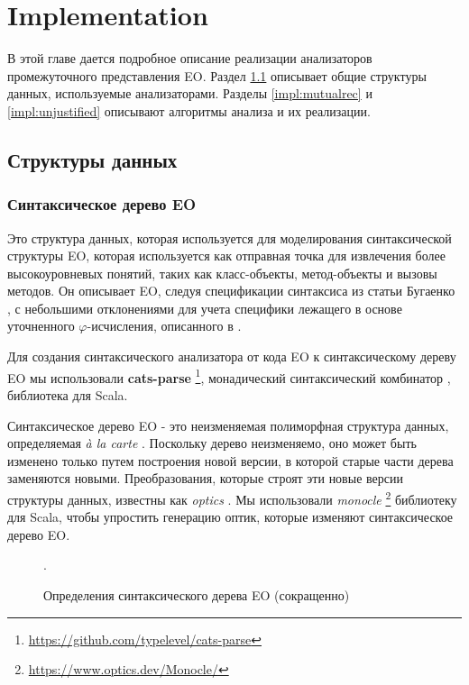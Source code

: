 \chapter{Implementation}
\label{chap:impl}
В этой главе дается подробное описание реализации анализаторов промежуточного представления EO. Раздел \ref{impl:data_structures} описывает общие структуры данных, используемые анализаторами. Разделы \ref{impl:mutualrec} и \ref{impl:unjustified} описывают алгоритмы анализа и их реализации.

\section{Структуры данных}
\label{impl:data_structures}

\subsection{Синтаксическое дерево EO}
Это структура данных, которая используется для моделирования синтаксической структуры EO, которая используется как отправная точка для извлечения более высокоуровневых понятий, таких как класс-объекты, метод-объекты и вызовы методов. Он описывает EO, следуя спецификации синтаксиса из статьи Бугаенко \cite{eolang}, с небольшими отклонениями для учета специфики лежащего в основе уточненного $\varphi$-исчисления, описанного в \cite{kudasov}. 

Для создания синтаксического анализатора от кода EO к синтаксическому дереву EO мы использовали \textbf{cats-parse} \footnote{\url{https://github.com/typelevel/cats-parse}}, монадический синтаксический комбинатор \cite{hill_combinators_1996}, библиотека для Scala.

Синтаксическое дерево EO - это неизменяемая полиморфная структура данных, определяемая \textit{à la carte} \cite{alacarte} . 
Поскольку дерево неизменяемо, оно может быть изменено только путем построения новой версии, в которой старые части дерева заменяются новыми. Преобразования, которые строят эти новые версии структуры данных, известны как \textit{optics} \cite{optics}. Мы использовали \textit{monocle} \footnote{\url{https://www.optics.dev/Monocle/}} библиотеку для Scala, чтобы упростить генерацию оптик, которые изменяют синтаксическое дерево EO.  

\begin{figure}
    
    \caption{Определения синтаксического дерева EO (сокращенно)}.
    \label{fig:ast}
\end{figure}
